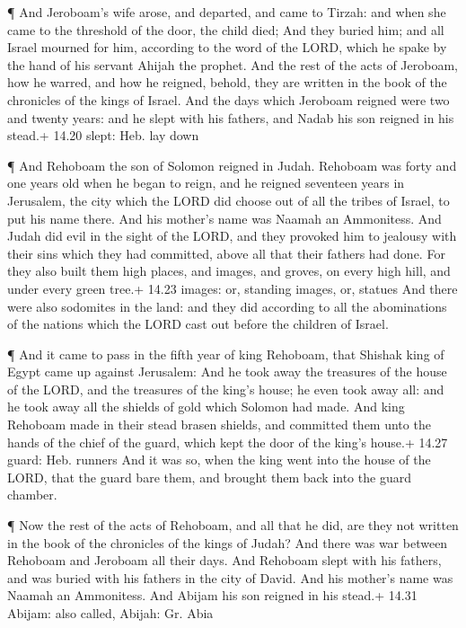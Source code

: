  ¶ And Jeroboam's wife arose, and departed, and came to
Tirzah: and when she came to the threshold of the door, the child died;
 And they buried him; and all Israel mourned for him,
according to the word of the LORD, which he spake by the hand of his
servant Ahijah the prophet.  And the rest of the acts of
Jeroboam, how he warred, and how he reigned, behold, they are written in
the book of the chronicles of the kings of Israel.  And the
days which Jeroboam reigned were two and twenty years: and he slept with
his fathers, and Nadab his son reigned in his stead.+ 14.20 slept: Heb.
lay down

 ¶ And Rehoboam the son of Solomon reigned in Judah.
Rehoboam was forty and one years old when he began to reign, and he
reigned seventeen years in Jerusalem, the city which the LORD did choose
out of all the tribes of Israel, to put his name there. And his mother's
name was Naamah an Ammonitess.  And Judah did evil in the
sight of the LORD, and they provoked him to jealousy with their sins
which they had committed, above all that their fathers had done.
 For they also built them high places, and images, and
groves, on every high hill, and under every green tree.+ 14.23 images:
or, standing images, or, statues  And there were also
sodomites in the land: and they did according to all the abominations of
the nations which the LORD cast out before the children of Israel.

 ¶ And it came to pass in the fifth year of king Rehoboam,
that Shishak king of Egypt came up against Jerusalem:  And
he took away the treasures of the house of the LORD, and the treasures
of the king's house; he even took away all: and he took away all the
shields of gold which Solomon had made.  And king Rehoboam
made in their stead brasen shields, and committed them unto the hands of
the chief of the guard, which kept the door of the king's house.+ 14.27
guard: Heb. runners  And it was so, when the king went into
the house of the LORD, that the guard bare them, and brought them back
into the guard chamber.

 ¶ Now the rest of the acts of Rehoboam, and all that he
did, are they not written in the book of the chronicles of the kings of
Judah?  And there was war between Rehoboam and Jeroboam all
their days.  And Rehoboam slept with his fathers, and was
buried with his fathers in the city of David. And his mother's name was
Naamah an Ammonitess. And Abijam his son reigned in his stead.+ 14.31
Abijam: also called, Abijah: Gr. Abia

